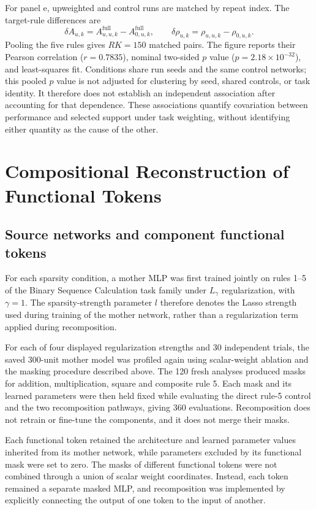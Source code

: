 \documentclass{article}
\begin{document}
For panel e, upweighted and control runs are matched by repeat index. The target-rule differences are
\begin{equation}
\delta A_{u,k}
=
A^{\mathrm{full}}_{u,u,k}-A^{\mathrm{full}}_{0,u,k},
\qquad
\delta\rho_{u,k}
=
\rho_{u,u,k}-\rho_{0,u,k}.
\end{equation}
Pooling the five rules gives $RK=150$ matched pairs. The figure reports their Pearson correlation ($r=0.7835$), nominal two-sided $p$ value ($p=2.18\times10^{-32}$), and least-squares fit. Conditions share run seeds and the same control networks; this pooled $p$ value is not adjusted for clustering by seed, shared controls, or task identity. It therefore does not establish an independent association after accounting for that dependence. These associations quantify covariation between performance and selected support under task weighting, without identifying either quantity as the cause of the other.

\section{Compositional Reconstruction of Functional Tokens}
\label{appendix:recomposition}

\subsection{Source networks and component functional tokens}

For each sparsity condition, a mother MLP was first trained jointly on rules 1--5 of the Binary Sequence Calculation task family under $L_{\gamma}$ regularization, with $\gamma=1$. The sparsity-strength parameter $l$ therefore denotes the Lasso strength used during training of the mother network, rather than a regularization term applied during recomposition.

For each of four displayed regularization strengths and 30 independent trials, the saved 300-unit mother model was profiled again using scalar-weight ablation and the masking procedure described above. The 120 fresh analyses produced masks for addition, multiplication, square and composite rule 5. Each mask and its learned parameters were then held fixed while evaluating the direct rule-5 control and the two recomposition pathways, giving 360 evaluations. Recomposition does not retrain or fine-tune the components, and it does not merge their masks.

Each functional token retained the architecture and learned parameter values inherited from its mother network, while parameters excluded by its functional mask were set to zero. The masks of different functional tokens were not combined through a union of scalar weight coordinates. Instead, each token remained a separate masked MLP, and recomposition was implemented by explicitly connecting the output of one token to the input of another.
\end{document}
